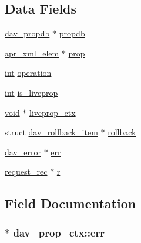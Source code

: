 \subsection*{Data Fields}
\begin{DoxyCompactItemize}
\item 
\hyperlink{structdav__propdb}{dav\+\_\+propdb} $\ast$ \hyperlink{structdav__prop__ctx_a2dbe9c4f2be24216e80f9716bf472ee2}{propdb}
\item 
\hyperlink{structapr__xml__elem}{apr\+\_\+xml\+\_\+elem} $\ast$ \hyperlink{structdav__prop__ctx_a4284209a8b4c169bc388c079670d13ce}{prop}
\item 
\hyperlink{pcre_8txt_a42dfa4ff673c82d8efe7144098fbc198}{int} \hyperlink{structdav__prop__ctx_aba3e83cb1c081e65f9b6834e055c782b}{operation}
\item 
\hyperlink{pcre_8txt_a42dfa4ff673c82d8efe7144098fbc198}{int} \hyperlink{structdav__prop__ctx_ac2d5a3da76de7cebd58184ff4d068b08}{is\+\_\+liveprop}
\item 
\hyperlink{group__MOD__ISAPI_gacd6cdbf73df3d9eed42fa493d9b621a6}{void} $\ast$ \hyperlink{structdav__prop__ctx_ac012d4d0d05d2da1d6e99a43d9fb8ca8}{liveprop\+\_\+ctx}
\item 
struct \hyperlink{structdav__rollback__item}{dav\+\_\+rollback\+\_\+item} $\ast$ \hyperlink{structdav__prop__ctx_a1c4d12a7cd504a2e39b7af5e15637244}{rollback}
\item 
\hyperlink{structdav__error}{dav\+\_\+error} $\ast$ \hyperlink{structdav__prop__ctx_a3ca7a3c562221804cb1580ffe13770f8}{err}
\item 
\hyperlink{structrequest__rec}{request\+\_\+rec} $\ast$ \hyperlink{structdav__prop__ctx_a375a8477199e03c98ae5d3a8ae40525f}{r}
\end{DoxyCompactItemize}


\subsection{Field Documentation}
\subsubsection[{\texorpdfstring{err}{err}}]{$\ast$ dav\+\_\+prop\+\_\+ctx\+::err}\hypertarget{structdav__prop__ctx_a3ca7a3c562221804cb1580ffe13770f8}{}\label{structdav__prop__ctx_a3ca7a3c562221804cb1580ffe13770f8}
